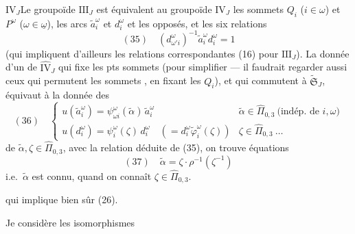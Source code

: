 \documentclass[11pt,a4paper]{article}
\begin{document}
$\mathrm{IV}_J$\quad Le groupoïde $\mathrm{III}_J$ est équivalent au groupoïde $\mathrm{IV}_J$   les sommets $Q_i$ ($i \in \omega$) et $P^{\omega}$ ($\omega \in \underline{\omega}$), les arcs $\tilde a_i^{\omega}$ et $d_i^{\omega}$ et les  opposés, et les six relations
\[
(35)\quad (d^{\omega}_{\omega' i})^{-1} \tilde a_i^{\omega} d_i^{\omega} = 1
\]
(qui impliquent d'ailleurs les relations correspondantes (16) pour $\mathrm{III}_J$). La donnée d'un   de $\widehat{\mathrm{IV}}_J$ qui fixe les pts sommets (pour simplifier — il faudrait regarder aussi ceux qui permutent les sommets , en fixant les $Q_i$),  et qui commutent à $\widetilde{\mathfrak{S}}_J$, équivaut à la donnée des
\[
(36)\quad
\begin{cases}
u(\tilde a_i^{\omega}) = \psi^{\omega}_{\omega i}(\tilde\alpha)\, \tilde a_i^{\omega} & \tilde\alpha \in \widehat{\Pi}_{0,3} \ \text{(indép. de } i, \omega) \\
u(d_i^{\omega}) = \psi_i^{\omega}(\zeta)\, d_i^{\omega} \quad (= d_i^{\omega} \tilde\varphi_i^{\omega}(\zeta)) & \zeta \in \widehat{\Pi}_{0,3}\ \ldots
\end{cases}
\]
de $\tilde\alpha, \zeta \in \widehat{\Pi}_{0,3}$, avec la relation déduite de (35), on trouve  équations
\[
(37)\quad \tilde\alpha = \zeta \cdot \rho^{-1}(\zeta^{-1})
\]
i.e.\ $\tilde\alpha$ est connu, quand on connaît $\zeta \in \widehat{\Pi}_{0,3}$.

qui implique bien sûr (26).

Je  considère les isomorphismes

\end{document}
